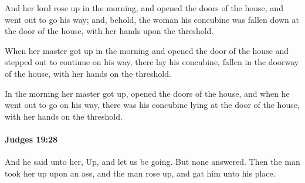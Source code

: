 			\begin{versebox}
					\item[BHS] 
					\item[ASV] And her lord rose up in the morning, and opened the doors of the house, and went out to go his way; and, behold, the woman his concubine was fallen down at the door of the house, with her hands upon the threshold.
					\item[NIV] When her master got up in the morning and opened the door of the house and stepped out to continue on his way, there lay his concubine, fallen in the doorway of the house, with her hands on the threshold.
					\item[NRSV] In the morning her master got up, opened the doors of the house, and when he went out to go on his way, there was his concubine lying at the door of the house, with her hands on the threshold.
			\end{versebox}

		\paragraph{Judges 19:28} %
			\label{JUDGES-19-28}

			And he said unto her, Up, and let us be going. But none answered. Then the man took her up upon an ass, and the man rose up, and gat him unto his place.

